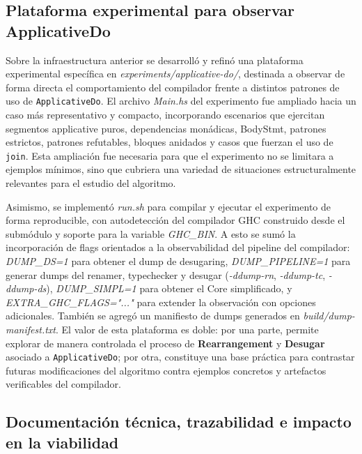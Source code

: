 \subsection{Plataforma experimental para observar \texttt{}{ApplicativeDo}}

Sobre la infraestructura anterior se desarrolló y refinó una plataforma experimental específica en \textit{experiments/applicative-do/}, destinada a observar de forma directa el comportamiento del compilador frente a distintos patrones de uso de \texttt{ApplicativeDo}. El archivo \textit{Main.hs} del experimento fue ampliado hacia un caso más representativo y compacto, incorporando escenarios que ejercitan segmentos applicative puros, dependencias monádicas, BodyStmt, patrones estrictos, patrones refutables, bloques anidados y casos que fuerzan el uso de \texttt{join}. Esta ampliación fue necesaria para que el experimento no se limitara a ejemplos mínimos, sino que cubriera una variedad de situaciones estructuralmente relevantes para el estudio del algoritmo.

Asimismo, se implementó \textit{run.sh} para compilar y ejecutar el experimento de forma reproducible, con autodetección del compilador \textsf{GHC} construido desde el submódulo y soporte para la variable \textit{GHC\_BIN}. A esto se sumó la incorporación de flags orientados a la observabilidad del pipeline del compilador: \textit{DUMP\_DS=1} para obtener el dump de desugaring, \textit{DUMP\_PIPELINE=1} para generar dumps del renamer, typechecker y desugar (\textit{-ddump-rn}, \textit{-ddump-tc}, \textit{-ddump-ds}), \textit{DUMP\_SIMPL=1} para obtener el Core simplificado, y \textit{EXTRA\_GHC\_FLAGS="..."} para extender la observación con opciones adicionales. También se agregó un manifiesto de dumps generados en \textit{build/dump-manifest.txt}. El valor de esta plataforma es doble: por una parte, permite explorar de manera controlada el proceso de \textbf{Rearrangement} y \textbf{Desugar} asociado a \texttt{ApplicativeDo}; por otra, constituye una base práctica para contrastar futuras modificaciones del algoritmo contra ejemplos concretos y artefactos verificables del compilador.

\newpage

\subsection{Documentación técnica, trazabilidad e impacto en la viabilidad}

